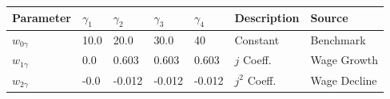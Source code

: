\small\begin{tabular}{l l l l l l l} 
\hline 
 Parameter & $\gamma_1$ &  $\gamma_2$ & $\gamma_3$ & $\gamma_4$ & Description & Source \\ 
\hline 
$w_{0\gamma}$ & 10.0 & 20.0 
               & 30.0 & 40 
               & Constant & Benchmark \\ 
$w_{1\gamma}$ & 0.0 &  0.603 
               & 0.603 & 0.603 
               & $j$ Coeff. & Wage Growth \\ 
$w_{2\gamma}$ & -0.0 &  -0.012 
               & -0.012 & -0.012 
               & $j^{2}$ Coeff. & Wage Decline \\ 
\hline 
\end{tabular}